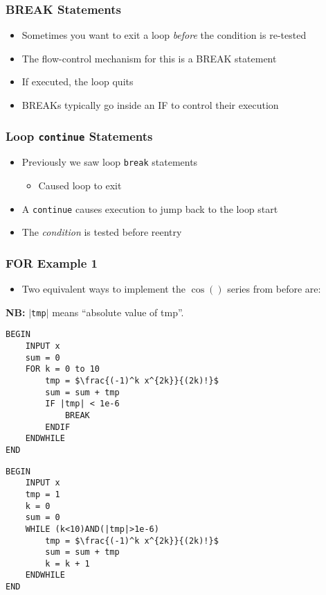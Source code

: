 \documentclass[14pt]{beamer}
\begin{document}
\begin{frame}
\frametitle{BREAK Statements}
\begin{itemize}
\item Sometimes you want to exit a loop \textit{before} the condition is re-tested
\item The flow-control mechanism for this is a BREAK statement
\item If executed, the loop quits
\item BREAKs typically go inside an IF to control their execution
\end{itemize}
\end{frame}

\begin{frame}
\frametitle{Loop \texttt{continue} Statements}
\begin{itemize}
	\item Previously we saw loop \texttt{break} statements
		\begin{itemize}
			\item Caused loop to exit
		\end{itemize}
	\item A \texttt{continue} causes execution to jump back to the loop start
	\item The \textit{condition} is tested before reentry
	
\end{itemize}
\end{frame}

\begin{frame}[fragile]
\frametitle{FOR Example 1}
\begin{itemize}
\item Two equivalent ways to implement the $\cos()$ series from before are:
\end{itemize}
{\small\textbf{NB:} $|$\texttt{tmp}$|$ means ``absolute value of tmp''.}
\begin{multicols}{2}
\begin{lstlisting}[style=pseudo,mathescape=true,basicstyle=\ttfamily\scriptsize]
BEGIN
	INPUT x
	sum = 0
	FOR k = 0 to 10
		tmp = $\frac{(-1)^k x^{2k}}{(2k)!}$
		sum = sum + tmp
		IF |tmp| < 1e-6
			BREAK
		ENDIF
	ENDWHILE 
END
\end{lstlisting}
\columnbreak
\begin{lstlisting}[style=pseudo,mathescape=true,basicstyle=\ttfamily\scriptsize]
BEGIN
	INPUT x
	tmp = 1
	k = 0
	sum = 0
	WHILE (k<10)AND(|tmp|>1e-6)
		tmp = $\frac{(-1)^k x^{2k}}{(2k)!}$
		sum = sum + tmp
		k = k + 1
	ENDWHILE 
END
\end{lstlisting}

\end{multicols}
\end{frame}
\end{document}
